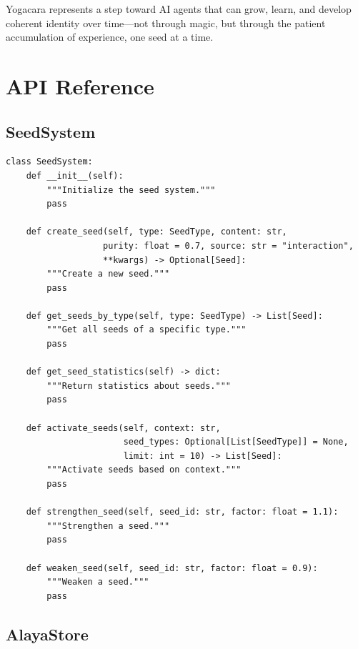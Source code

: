 \documentclass[11pt, a4paper]{article}
\begin{document}
Yogacara represents a step toward AI agents that can grow, learn, and develop coherent identity over time---not through magic, but through the patient accumulation of experience, one seed at a time.




\appendix
\section{API Reference}

\subsection{SeedSystem}

\begin{lstlisting}[style=python, caption={SeedSystem API}]
class SeedSystem:
    def __init__(self):
        """Initialize the seed system."""
        pass
    
    def create_seed(self, type: SeedType, content: str, 
                   purity: float = 0.7, source: str = "interaction",
                   **kwargs) -> Optional[Seed]:
        """Create a new seed."""
        pass
    
    def get_seeds_by_type(self, type: SeedType) -> List[Seed]:
        """Get all seeds of a specific type."""
        pass
    
    def get_seed_statistics(self) -> dict:
        """Return statistics about seeds."""
        pass
    
    def activate_seeds(self, context: str, 
                       seed_types: Optional[List[SeedType]] = None,
                       limit: int = 10) -> List[Seed]:
        """Activate seeds based on context."""
        pass
    
    def strengthen_seed(self, seed_id: str, factor: float = 1.1):
        """Strengthen a seed."""
        pass
    
    def weaken_seed(self, seed_id: str, factor: float = 0.9):
        """Weaken a seed."""
        pass
\end{lstlisting}

\subsection{AlayaStore}
\end{document}
